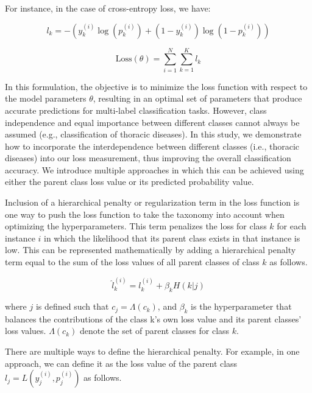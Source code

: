 For instance, in the case of cross-entropy loss, we have:

\begin{equation}
    l_k = -\left(y_k^{(i)}\log(p_k^{(i)}) + (1 - y_k^{(i)})\log(1 - p_k^{(i)})\right)
    \label{eq:taxonomy.eq.2.loss}
\end{equation}

\begin{equation}
    \text{Loss}(\theta) = \sum_{i=1}^{N}\sum_{k=1}^{K}l_k
    \label{eq:taxonomy.eq.3.totalloss}
\end{equation}

In this formulation, the objective is to minimize the loss function with respect to the model parameters $\theta $, resulting in an optimal set of parameters that produce accurate predictions for multi-label classification tasks. However, class independence and equal importance between different classes cannot always be assumed (e.g., classification of thoracic diseases). In this study, we demonstrate how to incorporate the interdependence between different classes (i.e., thoracic diseases) into our loss measurement, thus improving the overall classification accuracy. We introduce multiple approaches in which this can be achieved using either the parent class loss value or its predicted probability value.

Inclusion of a hierarchical penalty or regularization term in the loss function is one way to push the loss function to take the taxonomy into account when optimizing the hyperparameters. This term penalizes the loss for class $k $ for each instance $i $ in which the likelihood that its parent class exists in that instance is low. This can be represented mathematically by adding a hierarchical penalty term equal to the sum of the loss values of all parent classes of class $k $ as follows.

\begin{equation}
    \widehat{l}_{k}^{(i)} = l_{k}^{(i)}+\beta_k H (k \vert j)
    \label{eq:taxonomy.eq.3.newloss}
\end{equation}

where $j $ is defined such that $c_j=\Lambda(c_k) $, and $\beta_k $ is the hyperparameter that balances the contributions of the class k's own loss value and its parent classes' loss values. $\Lambda(c_k) $ denote the set of parent classes for class $k $.

There are multiple ways to define the hierarchical penalty. For example, in one approach, we can define it as the loss value of the parent class $l_j=L\left(y_j^{(i)},p_j^{(i)}\right) $ as follows.

